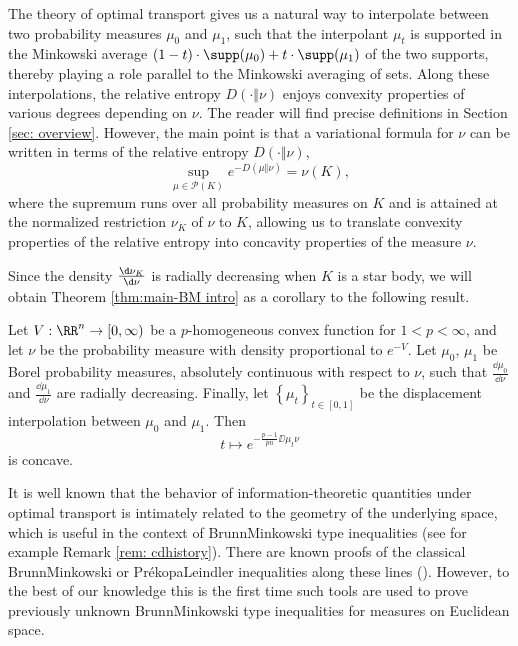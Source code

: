 The theory of optimal transport gives us a natural way to interpolate between two probability measures $\mu_{0}$ and $\mu_{1}$, such that the interpolant $\mu_{t}$ is supported in the Minkowski average $(1-t) \cdot \supp(\mu_{0}) + t \cdot \supp(\mu_{1})$ of the two supports, thereby playing a role parallel to the Minkowski averaging of sets. Along these interpolations, the relative entropy $D(\cdot \Vert \nu)$ enjoys convexity properties of various degrees depending on $\nu$. The reader will find precise definitions in Section \ref{sec: overview}. However, the main point is that a variational formula for $\nu$ can be written in terms of the relative entropy $D(\cdot \Vert \nu)$,
\begin{equation} \label{eq: variationalmeasureIntro}
\sup_{\mu \in \mathcal{P}(K)} e^{- D(\mu \Vert \nu)} = \nu (K),
\end{equation}
where the supremum runs over all probability measures on $K$ and is attained at the normalized restriction $\nu_{K}$ of $\nu$ to $K$, allowing us to translate convexity properties of the relative entropy into concavity properties of the measure $\nu$. 



Since the density $\frac{\d \nu_{K}}{ \d \nu}$ is radially decreasing when $K$ is a star body, we will obtain Theorem \ref{thm:main-BM intro} as a corollary to the following result.
\begin{thm}
\label{thm:main-entropy}Let $V:\RR^{n}\to[0,\infty)$ be a $p$-homogeneous
convex function for $1<p<\infty$, and let $\nu$ be the probability
measure with density proportional to $e^{-V}$. Let $\mu_{0}$, $\mu_{1}$
be Borel probability measures, absolutely continuous with respect
to $\nu$, such that $\frac{\dd\mu_{0}}{\dd\nu}$ and $\frac{\dd\mu_{1}}{\dd\nu}$
are radially decreasing. Finally, let $\left\{ \mu_{t}\right\} _{t\in[0,1]}$
be the displacement interpolation between $\mu_{0}$ and $\mu_{1}$.
Then 
\begin{equation}
t\mapsto e^{-\frac{p-1}{pn}\DD{\mu_{t}}{\nu}}
\end{equation}
 is concave. 
\end{thm}

It is well known that the behavior of information-theoretic quantities under optimal transport is intimately related to the geometry of the underlying space, which is useful in the context of Brunn\textendash Minkowski type inequalities (see  for example Remark \ref{rem: cdhistory}). There are known proofs of the classical Brunn\textendash Minkowski or Prékopa\textendash Leindler
inequalities along these lines (\cite[Chapter 6]{Villani03}). However, to the best of
our knowledge this is the first time such tools are used to prove
previously unknown Brunn\textendash Minkowski type inequalities for measures on Euclidean space. 

